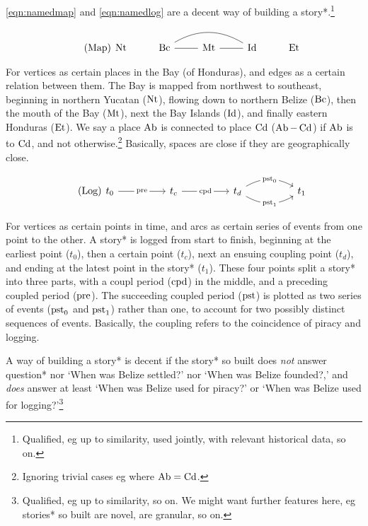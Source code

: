 	\begin{clm}
	\label{clm:maindecency}
		\ref{eqn:namedmap} and \ref{eqn:namedlog} are a decent way of building a story*.\footnote{Qualified, eg up to similarity, used jointly, with relevant historical data, so on.}
	\end{clm}
	
	\begin{equation}
	\tag{Map}
	\label{eqn:namedmap}
		\begin{tikzcd}[arrows=dash]
		\nt &\bc \rar \ar[rr,bend left] &\mt \rar &\id &\et
		\end{tikzcd}
	\end{equation}
	
	For vertices as certain places in the Bay (of Honduras), and edges as a certain relation between them. The Bay is mapped from northwest to southeast, beginning in northern Yucatan (\(\operatorname{Nt}\)), flowing down to northern Belize (\(\operatorname{Bc}\)), then the mouth of the Bay (\(\operatorname{Mt}\)), next the Bay Islands (\(\operatorname{Id}\)), and finally eastern Honduras (\(\operatorname{Et}\)). We say a place \(\operatorname{Ab}\) is connected to place \(\operatorname{Cd}\) (\(\operatorname{Ab}-\operatorname{Cd}\)) if \(\operatorname{Ab}\) is  to \(\operatorname{Cd}\), and not otherwise.\footnote{Ignoring trivial cases eg where \(\operatorname{Ab}=\operatorname{Cd}\).} Basically, spaces are close if they are geographically close.
	
	\begin{equation}
	\tag{Log}
	\label{eqn:namedlog}
		\begin{tikzcd}[sep=huge]
		t_0 \rar["\pre" description] &t_c \rar["\cpd" description] &t_d \rar[bend left,"\pst_0" description] \rar[bend right,"\pst_1" description] &t_1
		\end{tikzcd}
	\end{equation}
	
	For vertices as certain points in time, and arcs as certain series of events from one point to the other. A story* is logged from start to finish, beginning at the earliest point (\(t_0\)), then a certain  point (\(t_c\)), next an ensuing coupling point (\(t_d\)), and ending at the latest point in the story* (\(t_1\)). These four points split a story* into three parts, with a coupl period (\(\operatorname{cpd}\)) in the middle, and a preceding coupled period (\(\operatorname{pre}\)). The succeeding coupled period (\(\operatorname{pst}\)) is plotted as two series of events (\(\operatorname{pst}_0\) and \(\operatorname{pst}_1\)) rather than one, to account for two possibly distinct sequences of events. Basically, the coupling refers to the coincidence of piracy and logging.	
	\begin{gloss}
	\label{gloss:decency}
		A way of building a story* is decent if the story* so built does \emph{not} answer question* nor `When was Belize settled?' nor `When was Belize founded?,' and \emph{does} answer at least `When was Belize used for piracy?' or `When was Belize used for logging?'\footnote{Qualified, eg up to similarity, so on. We might want further features here, eg stories* so built are novel, are granular, so on.}
	\end{gloss}
	
